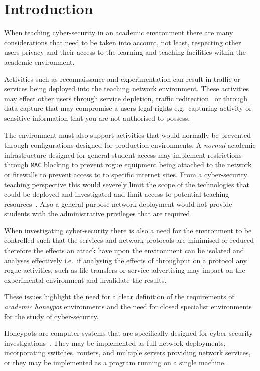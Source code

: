 \section{Introduction}\label{intro}
When teaching cyber-security in an academic environment there are many
considerations that need to be taken into account, not least, respecting other
users privacy and their access to the learning and teaching facilities within
the academic environment.

Activities such as reconnaissance and experimentation can result in traffic or
services being deployed into the teaching network environment. These activities
may effect other users through service depletion, traffic
redirection~\cite{ACGO:06,LR:06} or through data capture that may compromise a
users legal rights e.g.\ capturing activity or sensitive information that you
are not authorised to possess.

The environment must also support activities that would normally be prevented
through configurations designed for production environments. A \emph{normal}
academic infrastructure designed for general student access may implement
restrictions through \texttt{MAC} blocking to prevent rogue equipment being
attached to the network or firewalls to prevent access to to specific internet
sites. From a cyber-security teaching perspective this would severely limit the
scope of the technologies that could be deployed and investigated and limit
access to potential teaching resources~\cite{ACGO:06,YYLCHJ:04}. Also a general
purpose network deployment would not provide students with the administrative
privileges that are required.

When investigating cyber-security there is also a need for the environment to
be controlled such that the services and network protocols are minimised or
reduced  therefore the effects an attack have upon the environment can be
isolated and analyses effectively i.e.\ if analysing the effects of throughput
on a protocol any rogue activities, such as file transfers or service
advertising may impact on the experimental environment and invalidate the
results.

These issues highlight the need for a clear definition of the requirements of
\emph{academic honeypot} environments and the need for closed specialist
environments for the study of cyber-security.

Honeypots are computer systems that are specifically designed for
cyber-security investigations~\cite{FKAS:17,BCF:12,ZZQL:03}. They may be
implemented as full network deployments, incorporating switches, routers, and
multiple servers providing network services, or they may be implemented as a
program running on a single machine. 

